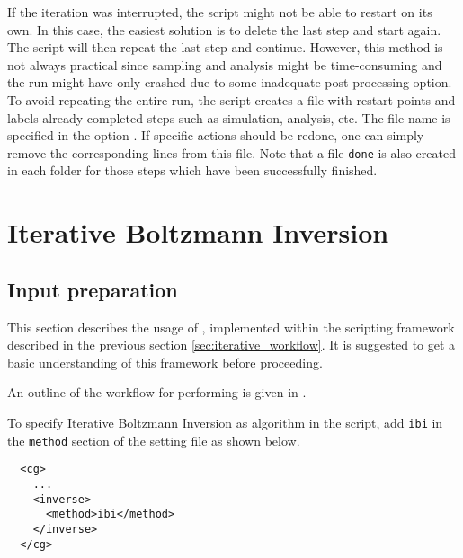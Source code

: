 If the iteration was interrupted, the script  might not be able to restart on its own. In this case, the easiest solution is to delete the last step and start again. The script will then repeat the last step and continue. However, this method is not always practical since sampling and analysis might be time-consuming and the run might have only crashed due to some inadequate post processing option. To avoid repeating the entire run, the script  creates a file with restart points and labels already completed steps such as simulation, analysis, etc. The file name is specified in the option . If specific actions should be redone, one can simply remove the corresponding lines from this file. Note that a file \texttt{done} is also created in each folder for those steps which have been successfully finished.



\section{Iterative Boltzmann Inversion}
\subsection{Input preparation}
This section describes the usage of \ibi, implemented within the scripting framework described in the previous section \ref{sec:iterative_workflow}. It is suggested to get a basic understanding of this framework before proceeding.

An outline of the workflow for performing \ibi is given in .

To specify Iterative Boltzmann Inversion as algorithm in the script, add \texttt{ibi} in the \texttt{method} section of the \xml setting file as shown below.

\begin{lstlisting}
  <cg>
    ...
    <inverse>
      <method>ibi</method>
    </inverse>
  </cg>
\end{lstlisting}



